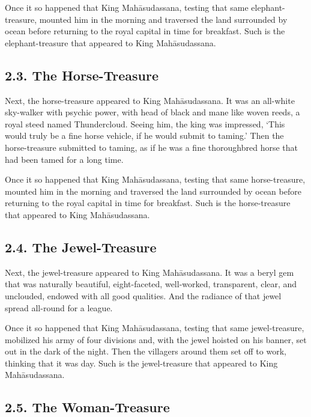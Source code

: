 \documentclass[12pt,openany]{book}%
\begin{document}
Once it so happened that King \textsanskrit{Mahāsudassana}, testing that same elephant-treasure, mounted him in the morning and traversed the land surrounded by ocean before returning to the royal capital in time for breakfast. Such is the elephant-treasure that appeared to King \textsanskrit{Mahāsudassana}. 

\subsection*{2.3. The Horse-Treasure }

Next, the horse-treasure appeared to King \textsanskrit{Mahāsudassana}. It was an all-white sky-walker with psychic power, with head of black and mane like woven reeds, a royal steed named Thundercloud. Seeing him, the king was impressed, ‘This would truly be a fine horse vehicle, if he would submit to taming.’ Then the horse-treasure submitted to taming, as if he was a fine thoroughbred horse that had been tamed for a long time. 

Once it so happened that King \textsanskrit{Mahāsudassana}, testing that same horse-treasure, mounted him in the morning and traversed the land surrounded by ocean before returning to the royal capital in time for breakfast. Such is the horse-treasure that appeared to King \textsanskrit{Mahāsudassana}. 

\subsection*{2.4. The Jewel-Treasure }

Next, the jewel-treasure appeared to King \textsanskrit{Mahāsudassana}. It was a beryl gem that was naturally beautiful, eight-faceted, well-worked, transparent, clear, and unclouded, endowed with all good qualities. And the radiance of that jewel spread all-round for a league. 

Once it so happened that King \textsanskrit{Mahāsudassana}, testing that same jewel-treasure, mobilized his army of four divisions and, with the jewel hoisted on his banner, set out in the dark of the night. Then the villagers around them set off to work, thinking that it was day. Such is the jewel-treasure that appeared to King \textsanskrit{Mahāsudassana}. 

\subsection*{2.5. The Woman-Treasure }
\end{document}
